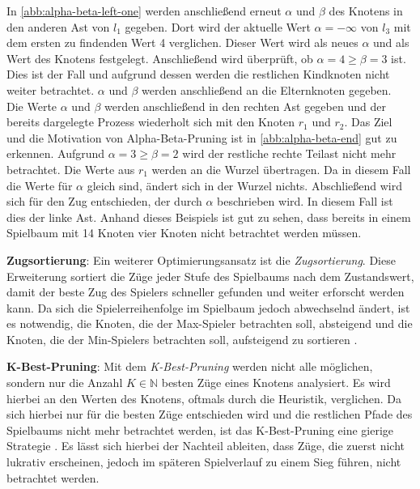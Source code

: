 \documentclass[12pt,a4paper,bibliography=totocnumbered,listof=totocnumbered]{article}
\begin{document}
In \autoref{abb:alpha-beta-left-one} werden anschließend erneut $\alpha$ und $\beta$ des Knotens in den anderen Ast von $l_1$ gegeben. Dort wird der aktuelle Wert $\alpha=-\infty$ von $l_3$ mit dem ersten zu findenden Wert 4 verglichen. Dieser Wert wird als neues $\alpha$ und als Wert des Knotens festgelegt. Anschließend wird überprüft, ob $\alpha=4\geq \beta=3$ ist. Dies ist der Fall und aufgrund dessen werden die restlichen Kindknoten nicht weiter betrachtet. $\alpha$ und $\beta$ werden anschließend an die Elternknoten gegeben.\\Die Werte $\alpha$ und $\beta$ werden anschließend in den rechten Ast gegeben und der bereits dargelegte Prozess wiederholt sich mit den Knoten $r_1$ und $r_2$. Das Ziel und die Motivation von Alpha-Beta-Pruning ist in \autoref{abb:alpha-beta-end} gut zu erkennen. Aufgrund $\alpha=3 \geq \beta=2$ wird der restliche rechte Teilast nicht mehr betrachtet. Die Werte aus $r_1$ werden an die Wurzel übertragen. Da in diesem Fall die Werte für $\alpha$ gleich sind, ändert sich in der Wurzel nichts. Abschließend wird sich für den Zug entschieden, der durch $\alpha$ beschrieben wird. In diesem Fall ist dies der linke Ast. Anhand dieses Beispiels ist gut zu sehen, dass bereits in einem Spielbaum mit 14 Knoten vier Knoten nicht betrachtet werden müssen.

\textbf{Zugsortierung}: Ein weiterer Optimierungsansatz ist die \emph{Zugsortierung}. Diese Erweiterung sortiert die Züge jeder Stufe des Spielbaums nach dem Zustandswert, damit der beste Zug des Spielers schneller gefunden und weiter erforscht werden kann.  Da sich die Spielerreihenfolge im Spielbaum jedoch abwechselnd ändert, ist es notwendig, die Knoten, die der Max-Spieler betrachten soll, absteigend und die Knoten, die der Min-Spielers betrachten soll, aufsteigend zu sortieren \citep{Polk.2016}.

\textbf{K-Best-Pruning}: Mit dem \emph{K-Best-Pruning} werden nicht alle möglichen, sondern nur die Anzahl $K \in \mathbb{N}$ besten Züge eines Knotens analysiert. Es wird hierbei an den Werten des Knotens, oftmals durch die Heuristik, verglichen. Da sich hierbei nur für die besten Züge entschieden wird und die restlichen Pfade des Spielbaums nicht mehr betrachtet werden, ist das K-Best-Pruning eine gierige Strategie \citep{Winands.2010}. Es lässt sich hierbei der Nachteil ableiten, dass Züge, die zuerst nicht lukrativ erscheinen, jedoch im späteren Spielverlauf zu einem Sieg führen, nicht betrachtet werden. 
\end{document}
